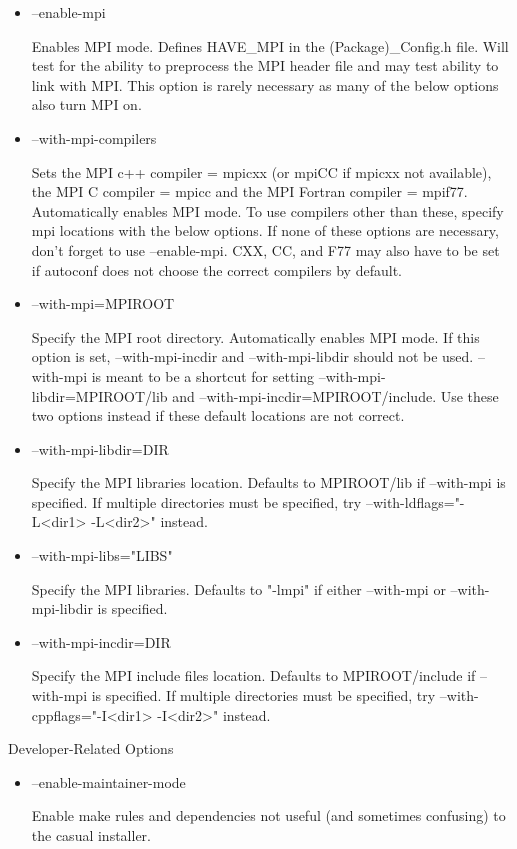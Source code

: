 \documentclass[12pt,relax]{TrilinosDevGuide}
\begin{document}
\begin{itemize}
\item --enable-mpi 

Enables MPI mode. Defines HAVE\_MPI in the (Package)\_Config.h file. Will test 
for the ability to preprocess the MPI header file and may test ability to link 
with MPI.  This option is rarely necessary as many of the below options also 
turn MPI on.  

\item --with-mpi-compilers

Sets the MPI c++ compiler = mpicxx (or mpiCC if mpicxx not available), 
the MPI C compiler = mpicc and the MPI Fortran compiler = mpif77.  
Automatically enables MPI mode.  To use compilers other than these, 
specify mpi locations with the below options.  If none of these options 
are necessary, don't forget to use --enable-mpi.  CXX, CC, and F77 may also 
have to be set if autoconf does not choose the correct compilers by default.

\item --with-mpi=MPIROOT 

Specify the MPI root directory. Automatically enables MPI mode.  If this 
option is set, --with-mpi-incdir and --with-mpi-libdir should not be used.  
--with-mpi is meant to be a shortcut for setting --with-mpi-libdir=MPIROOT/lib 
and --with-mpi-incdir=MPIROOT/include.  Use these two options instead if 
these default locations are not correct.

\item --with-mpi-libdir=DIR 

Specify the MPI libraries location. Defaults to MPIROOT/lib if --with-mpi 
is specified. If multiple directories must be specified, try 
--with-ldflags="-L<dir1> -L<dir2>" instead. 

\item --with-mpi-libs="LIBS" 

Specify the MPI libraries. Defaults to "-lmpi" if either --with-mpi or 
--with-mpi-libdir is specified.

\item --with-mpi-incdir=DIR

Specify the MPI include files location. Defaults to MPIROOT/include if 
--with-mpi is specified. If multiple directories  must be specified, try 
--with-cppflags="-I<dir1> -I<dir2>" instead.
\end{itemize}

Developer-Related Options
\begin{itemize}
\item --enable-maintainer-mode 

Enable make rules and dependencies not useful (and sometimes confusing) to 
the casual installer.
\end{itemize}
\end{document}
